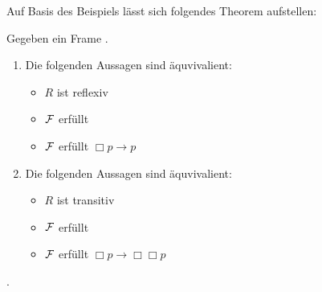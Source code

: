 Auf Basis des Beispiels lässt sich folgendes Theorem aufstellen:

\begin{theorem}
	Gegeben ein Frame \FrameDef.
	\begin{enumerate}
		\item Die folgenden Aussagen sind äquvivalient:
		\begin{itemize}
			\item $R$ ist reflexiv
			\item $\mathcal{F}$ erfüllt \TFormel
			\item $\mathcal{F}$ erfüllt $\Box p \rightarrow p$
		\end{itemize} 
		
		\item Die folgenden Aussagen sind äquvivalient:
		\begin{itemize}
			\item $R$ ist transitiv
			\item $\mathcal{F}$ erfüllt \vierFormel
			\item $\mathcal{F}$ erfüllt $\Box p \rightarrow \Box \Box p$
		\end{itemize}
	\end{enumerate}
	.
\end{theorem}

